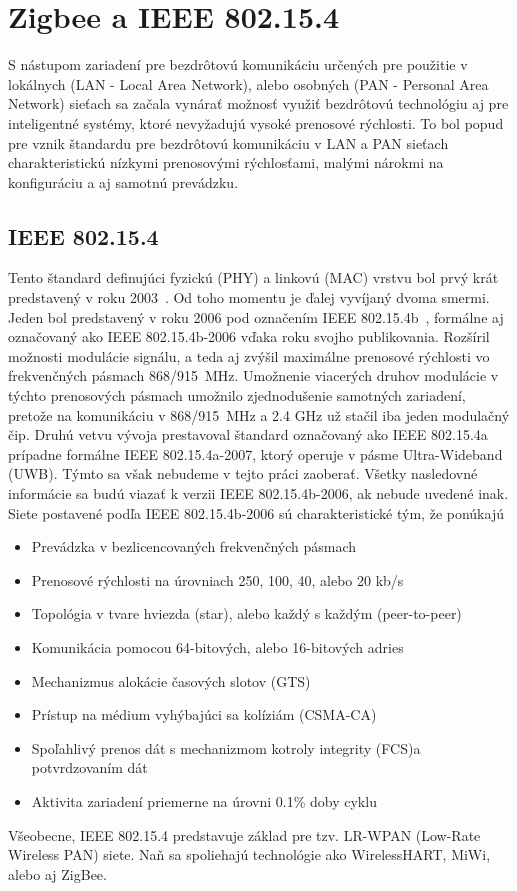 \chapter{Zigbee a IEEE 802.15.4}

\indent\indent S nástupom zariadení pre bezdrôtovú komunikáciu určených pre použitie v lokálnych (LAN - Local Area Network), alebo osobných (PAN - Personal Area Network) sieťach sa začala vynárať možnosť využiť bezdrôtovú technológiu aj pre inteligentné systémy, ktoré nevyžadujú vysoké prenosové rýchlosti. To bol popud pre vznik štandardu pre bezdrôtovú komunikáciu v LAN a PAN sieťach charakteristickú nízkymi prenosovými rýchlosťami, malými nárokmi na konfiguráciu a aj samotnú prevádzku.\\

\section{IEEE 802.15.4}

\indent\indent Tento štandard definujúci fyzickú (PHY) a linkovú (MAC) vrstvu bol prvý krát predstavený v roku 2003~\cite{ieee03}. Od toho momentu je ďalej vyvíjaný dvoma smermi. Jeden bol predstavený v roku 2006 pod označením IEEE 802.15.4b~\cite{ieee06}, formálne aj označovaný ako IEEE 802.15.4b-2006 vďaka roku svojho publikovania. Rozšíril možnosti modulácie signálu, a teda aj zvýšil maximálne prenosové rýchlosti vo frekvenčných pásmach 868/915~MHz. Umožnenie viacerých druhov modulácie v týchto prenosových pásmach umožnilo zjednodušenie samotných zariadení, pretože na komunikáciu v 868/915~MHz a 2.4 GHz už stačil iba jeden modulačný čip. Druhú vetvu vývoja prestavoval štandard označovaný ako IEEE 802.15.4a prípadne formálne IEEE 802.15.4a-2007, ktorý operuje v pásme Ultra-Wideband (UWB). Týmto sa však nebudeme v tejto práci zaoberať. Všetky nasledovné informácie sa budú viazať k verzii IEEE 802.15.4b-2006, ak nebude uvedené inak.\\
\indent Siete postavené podľa IEEE 802.15.4b-2006 sú charakteristické tým, že ponúkajú
\begin{itemize}
\item Prevádzka v bezlicencovaných frekvenčných pásmach
\item Prenosové rýchlosti na úrovniach 250, 100, 40, alebo 20 kb/s
\item Topológia v tvare hviezda (star), alebo každý s každým (peer-to-peer)
\item Komunikácia pomocou 64-bitových, alebo 16-bitových adries
\item Mechanizmus alokácie časových slotov (GTS)
\item Prístup na médium vyhýbajúci sa kolíziám (CSMA-CA)
\item Spoľahlivý prenos dát s mechanizmom kotroly integrity (FCS)a potvrdzovaním dát
\item Aktivita zariadení priemerne na úrovni 0.1\% doby cyklu
\end{itemize}
\indent Všeobecne, IEEE 802.15.4 predstavuje základ pre tzv. LR-WPAN (Low-Rate Wireless PAN) siete. Naň sa spoliehajú technológie ako WirelessHART, MiWi, alebo aj ZigBee.\\

